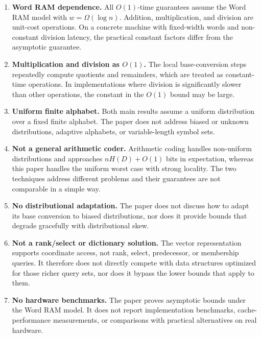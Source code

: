 \begin{enumerate}[label=(\arabic*)]

\item \textbf{Word RAM dependence.}
  All $O(1)$-time guarantees assume the Word RAM model with
  $w=\Omega(\log n)$.  Addition, multiplication, and division are unit-cost
  operations.  On a concrete machine with fixed-width words and non-constant
  division latency, the practical constant factors differ from the asymptotic
  guarantee.

\item \textbf{Multiplication and division as $O(1)$.}
  The local base-conversion steps repeatedly compute quotients and
  remainders, which are treated as constant-time operations.  In
  implementations where division is significantly slower than other
  operations, the constant in the $O(1)$ bound may be large.

\item \textbf{Uniform finite alphabet.}
  Both main results assume a uniform distribution over a fixed finite
  alphabet.  The paper does not address biased or unknown distributions,
  adaptive alphabets, or variable-length symbol sets.

\item \textbf{Not a general arithmetic coder.}
  Arithmetic coding handles non-uniform distributions and approaches
  $nH(D)+O(1)$ bits in expectation, whereas this paper handles the uniform
  worst case with strong locality.  The two techniques address different
  problems and their guarantees are not comparable in a simple way.

\item \textbf{No distributional adaptation.}
  The paper does not discuss how to adapt its base conversion to biased
  distributions, nor does it provide bounds that degrade gracefully with
  distributional skew.

\item \textbf{Not a rank/select or dictionary solution.}
  The vector representation supports coordinate access, not rank, select,
  predecessor, or membership queries.  It therefore does not directly compete
  with data structures optimized for those richer query sets, nor does it
  bypass the lower bounds that apply to them.

\item \textbf{No hardware benchmarks.}
  The paper proves asymptotic bounds under the Word RAM model.  It does not
  report implementation benchmarks, cache-performance measurements, or
  comparisons with practical alternatives on real hardware.


\end{enumerate}
